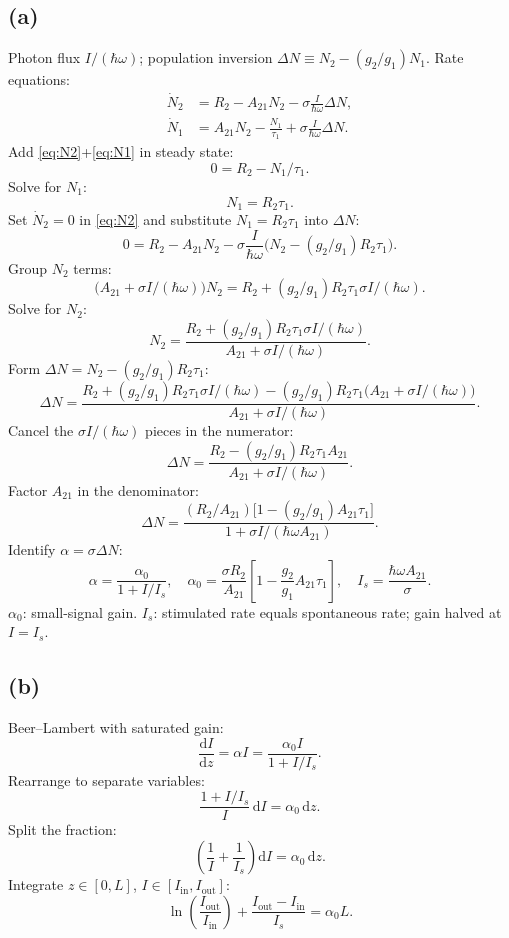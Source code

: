\documentclass[11pt]{article}
\newcommand{\de}{\mathrm{d}}
\begin{document}
\subsection*{(a)}

Photon flux $I/(\hbar\omega)$; population inversion $\Delta N\equiv N_2-(g_2/g_1)N_1$. Rate equations:
\begin{align}
\dot N_2&=R_2-A_{21}N_2-\sigma\frac{I}{\hbar\omega}\Delta N,\label{eq:N2}\\
\dot N_1&=A_{21}N_2-\frac{N_1}{\tau_1}+\sigma\frac{I}{\hbar\omega}\Delta N.\label{eq:N1}
\end{align}
Add \eqref{eq:N2}+\eqref{eq:N1} in steady state:
\[ 0=R_2-N_1/\tau_1. \]
Solve for $N_1$:
\[ N_1=R_2\tau_1. \]
Set $\dot N_2=0$ in \eqref{eq:N2} and substitute $N_1=R_2\tau_1$ into $\Delta N$:
\[ 0=R_2-A_{21}N_2-\sigma\frac{I}{\hbar\omega}\big(N_2-(g_2/g_1)R_2\tau_1\big). \]
Group $N_2$ terms:
\[ \big(A_{21}+\sigma I/(\hbar\omega)\big)N_2=R_2+(g_2/g_1)R_2\tau_1\sigma I/(\hbar\omega). \]
Solve for $N_2$:
\[ N_2=\frac{R_2+(g_2/g_1)R_2\tau_1\sigma I/(\hbar\omega)}{A_{21}+\sigma I/(\hbar\omega)}. \]
Form $\Delta N=N_2-(g_2/g_1)R_2\tau_1$:
\[ \Delta N=\frac{R_2+(g_2/g_1)R_2\tau_1\sigma I/(\hbar\omega)-(g_2/g_1)R_2\tau_1\big(A_{21}+\sigma I/(\hbar\omega)\big)}{A_{21}+\sigma I/(\hbar\omega)}. \]
Cancel the $\sigma I/(\hbar\omega)$ pieces in the numerator:
\[ \Delta N=\frac{R_2-(g_2/g_1)R_2\tau_1 A_{21}}{A_{21}+\sigma I/(\hbar\omega)}. \]
Factor $A_{21}$ in the denominator:
\[ \Delta N=\frac{(R_2/A_{21})\big[1-(g_2/g_1)A_{21}\tau_1\big]}{1+\sigma I/(\hbar\omega A_{21})}. \]
Identify $\alpha=\sigma\Delta N$:
\[ \boxed{\;\alpha=\frac{\alpha_0}{1+I/I_s},\quad \alpha_0=\frac{\sigma R_2}{A_{21}}\!\left[1-\frac{g_2}{g_1}A_{21}\tau_1\right],\quad I_s=\frac{\hbar\omega A_{21}}{\sigma}.\;} \]
$\alpha_0$: small-signal gain. $I_s$: stimulated rate equals spontaneous rate; gain halved at $I=I_s$.

\subsection*{(b)}

Beer--Lambert with saturated gain:
\[ \frac{\de I}{\de z}=\alpha I=\frac{\alpha_0 I}{1+I/I_s}. \]
Rearrange to separate variables:
\[ \frac{1+I/I_s}{I}\,\de I=\alpha_0\,\de z. \]
Split the fraction:
\[ \left(\frac{1}{I}+\frac{1}{I_s}\right)\de I=\alpha_0\,\de z. \]
Integrate $z\in[0,L]$, $I\in[I_\text{in},I_\text{out}]$:
\[ \boxed{\;\ln\!\left(\frac{I_\text{out}}{I_\text{in}}\right)+\frac{I_\text{out}-I_\text{in}}{I_s}=\alpha_0 L.\;} \]
\end{document}
